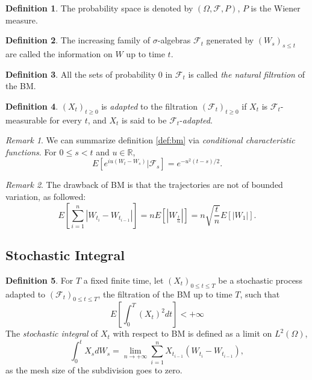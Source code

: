 \documentclass[a4paper,12pt]{article}
\numberwithin{equation}{section}
\theoremstyle{definition}
\newtheorem{definition}{Definition}[section]
\theoremstyle{remark}
\newtheorem{remark}{Remark}[section]
\begin{document}
\begin{definition}
The probability space is denoted by $(\Omega,\mathcal{F},P)$, 
$P$ is the Wiener measure.
\end{definition}

\begin{definition}
The increasing family of $\sigma$-algebras $\mathcal{F}_t$ 
generated by $(W_{s})_{s\leq t}$ are called the information 
on $W$ up to time $t$.
\end{definition}

\begin{definition}
All the sets of probability 0 in $\mathcal{F}_t$ is called 
\textit{the natural filtration} of the BM.
\end{definition}

\begin{definition}
$(X_t)_{t\geq 0}$ is \textit{adapted} to the filtration 
$(\mathcal{F}_t)_{t\geq 0}$ if $X_t$ is 
$\mathcal{F}_t$-measurable for every $t$, and $X_t$ is said to 
be $\mathcal{F}_t$-\textit{adapted}.
\end{definition}

\begin{remark}
We can summarize definition \ref{def:bm} via 
\textit{conditional characteristic functions}. For $0\leq s<t$ 
and $u \in \mathbb{R}$, 
\begin{equation}
\label{eq:bm_characteristic}
    E\left[e^{iu(W_{t}-W_{s})}|\mathcal{F}_{s}\right]
    =e^{-u^{2}(t-s)/2}.
\end{equation}
\end{remark}

\begin{remark}
The drawback of BM is that the trajectories are not of 
bounded variation, as followed: 
\begin{equation}
    E\left[\sum_{i=1}^{n}|W_{t_i}-W_{t_{i-1}}|\right]
    =nE\left[|W_{\frac{t}{n}}|\right]
    =n\sqrt{\frac{t}{n}}E\left[|W_1|\right].
\end{equation}
\end{remark}

\subsection{Stochastic Integral}
\begin{definition}
For $T$ a fixed finite time, let $(X_t)_{0\leq t\leq T}$ be a 
stochastic process adapted to $(\mathcal{F}_t)_{0\leq t\leq T}$, 
the filtration of the BM up to time $T$, such that 
\begin{equation}
\label{eq:stochastic_integrals_condition}
    E\left[\int_{0}^{T} (X_t)^{2} dt \right] < + \infty
\end{equation}
The \textit{stochastic integral} of $X_t$ with respect to BM 
is defined as a limit on $L^{2}(\Omega)$, 
\begin{equation}
\label{eq:stochastic_integral}
    \int_{0}^{t} X_s dW_s = \lim_{n\rightarrow+\infty} 
    \sum_{i=1}^{n} X_{t_{i-1}}(W_{t_i}-W_{t_{i-1}}),
\end{equation}
as the mesh size of the subdivision goes to zero.
\end{definition}
\end{document}
